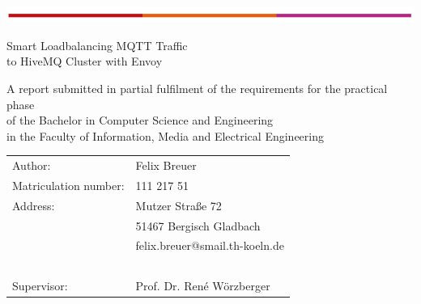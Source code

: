 \begin{titlepage}
\begin{flushleft}
	\vspace*{-1cm}
	\includegraphics[scale=1]{images/th-bar.png}\\
	\vspace*{1cm}
\end{flushleft}
\begin{center}
\begin{huge}
Smart Loadbalancing MQTT Traffic\\
to HiveMQ Cluster with Envoy\\
\end{huge}
\vspace{2cm}
A report submitted in partial fulfilment of the requirements for the practical phase \\of the Bachelor in Computer Science and Engineering \\in the Faculty of Information, Media and Electrical Engineering
\end{center}
\vspace{4cm}
\noindent\begin{tabular}{ll}
	Author: & Felix Breuer \\
	Matriculation number: &	111 217 51 \\
	Address: & Mutzer Straße 72 \\
	~ &	51467 Bergisch Gladbach \\
	~ &	felix.breuer@smail.th-koeln.de \\
	~ & ~ \\
	Supervisor: & Prof. Dr. René Wörzberger
\end{tabular}
~\\
~\\
~\\
~\\
~\\
~\\
\end{titlepage}
\newpage
